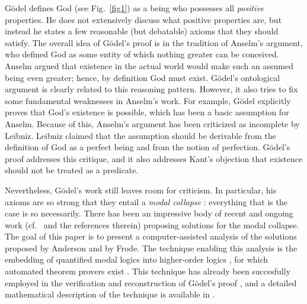 \documentclass{birkjour}
\theoremstyle{definition}
\theoremstyle{remark}
\numberwithin{equation}{section}
\begin{document}


G\"{o}del defines God (see Fig.~\ref{fig1}) as a being who possesses all \emph{positive}
properties.  He does not extensively discuss what positive properties
are, but instead he states a few reasonable (but debatable) axioms
that they should satisfy.  
The overall idea of G{\"o}del's proof is in the tradition of Anselm's
argument, who defined God as some entity of which nothing greater can be
conceived. Anselm argued that existence in the actual world would
make such an assumed being even greater; hence, by definition God must
exist. G{\"o}del's ontological argument is clearly related to this
reasoning pattern. However, it also tries to fix some fundamental
weaknesses in Anselm's work. For example, G{\"o}del explicitly proves
that God's existence is possible, which has been a basic assumption for
Anselm. Because of this, Anselm's argument has been
criticized as incomplete by Leibniz. Leibniz claimed that the
assumption should be derivable from the definition of God as a perfect
being and from the notion of perfection.  G{\"o}del's proof 
addresses this critique, and it also addresses Kant's objection that existence should not be treated as a predicate. 

Nevertheless, G{\"o}del's work
still leaves room for criticism. In particular, his axioms are so
strong that they entail a \emph{modal collapse} 
\cite{ToDo:sobel1987?,sobel2004logic}: 
everything that is the case is so necessarily. 
There has been an impressive body of recent and ongoing
work (cf.~\cite{sobel2004logic,Fitting,anderson90:_some_emend_of_goedel_ontol_proof,AndersonGettings,ToDo:FrodeAndHajek,ContemporaryBibliography} and the references therein)
proposing solutions for the modal collapse. 
The goal of this paper is to present a computer-assisted analysis of 
the solutions proposed by Anderson and by Frode. The technique enabling this analysis is the embedding of quantified modal logics into higher-order logics \cite{J23,B9,C36}, for which automated theorem provers exist \cite{ToDo:leo,sattalax,isabelle,coq}. This technique has already been succesfully employed in the verification and reconstruction of G\"odel's proof \cite{todo:all our previous papers}, and a detailed mathematical description of the technique is available in \cite{todo:ECAI}.
\end{document}
